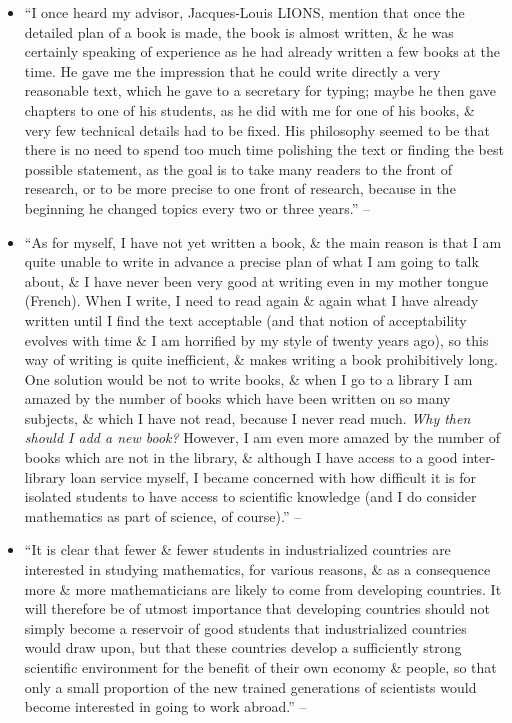 \documentclass{article}
\begin{document}
\begin{enumerate}
\begin{itemize}
		\item ``I once heard my advisor, Jacques-Louis LIONS, mention that once the detailed plan of a book is made, the book is almost written, \& he was certainly speaking of experience as he had already written a few books at the time. He gave me the impression that he could write directly a very reasonable text, which he gave to a secretary for typing; maybe he then gave chapters to one of his students, as he did with me for one of his books, \& very few technical details had to be fixed. His philosophy seemed to be that there is no need to spend too much time polishing the text or finding the best possible statement, as the goal is to take many readers to the front of research, or to be more precise to one front of research, because in the beginning he changed topics every two or three years.'' -- \cite[Preface, p. ix]{Tartar2006}
		\item ``As for myself, I have not yet written a book, \& the main reason is that I am quite unable to write in advance a precise plan of what I am going to talk about, \& I have never been very good at writing even in my mother tongue (French). When I write, I need to read again \& again what I have already written until I find the text acceptable (and that notion of acceptability evolves with time \& I am horrified by my style of twenty years ago), so this way of writing is quite inefficient, \& makes writing a book prohibitively long. One solution would be not to write books, \& when I go to a library I am amazed by the number of books which have been written on so many subjects, \& which I have not read, because I never read much. {\it Why then should I add a new book?} However, I am even more amazed by the number of books which are not in the library, \& although I have access to a good inter-library loan service myself, I became concerned with how difficult it is for isolated students to have access to scientific knowledge (and I do consider mathematics as part of science, of course).'' -- \cite[Preface, p. ix]{Tartar2006}
		\item ``It is clear that fewer \& fewer students in industrialized countries are interested in studying mathematics, for various reasons, \& as a consequence more \& more mathematicians are likely to come from developing countries. It will therefore be of utmost importance that developing countries should not simply become a reservoir of good students that industrialized countries would draw upon, but that these countries develop a sufficiently strong scientific environment for the benefit of their own economy \& people, so that only a small proportion of the new trained generations of scientists would become interested in going to work abroad.'' -- \cite[Preface, p. ix]{Tartar2006}

\end{itemize}
\end{enumerate}
\end{document}
